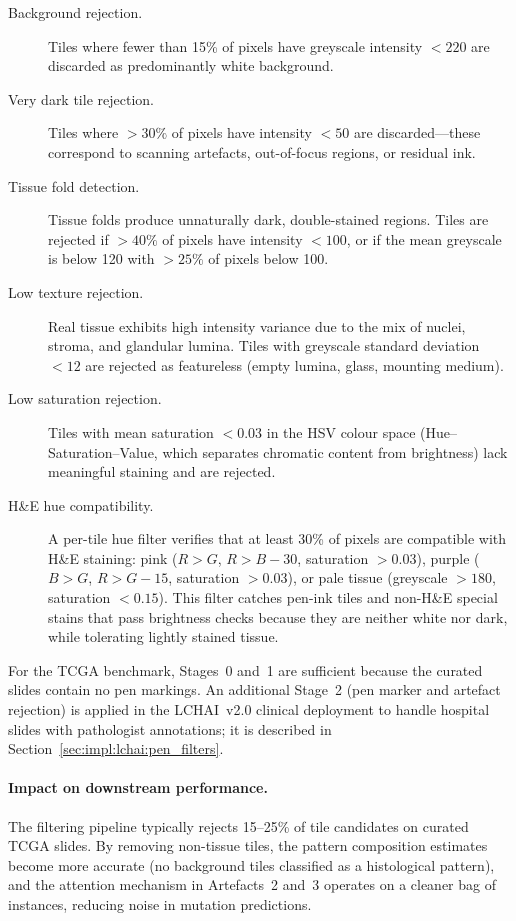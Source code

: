 \begin{description}
    \item[Background rejection.]
    Tiles where fewer than 15\% of pixels have greyscale intensity
    $< 220$ are discarded as predominantly white background.

    \item[Very dark tile rejection.]
    Tiles where $> 30\%$ of pixels have intensity $< 50$ are
    discarded---these correspond to scanning artefacts, out-of-focus
    regions, or residual ink.

    \item[Tissue fold detection.]
    Tissue folds produce unnaturally dark, double-stained regions.
    Tiles are rejected if $> 40\%$ of pixels have intensity $< 100$,
    or if the mean greyscale is below 120 with $> 25\%$ of pixels
    below 100.

    \item[Low texture rejection.]
    Real tissue exhibits high intensity variance due to the mix of
    nuclei, stroma, and glandular lumina.
    Tiles with greyscale standard deviation $< 12$ are rejected as
    featureless (empty lumina, glass, mounting medium).

    \item[Low saturation rejection.]
    Tiles with mean saturation $< 0.03$ in the HSV colour space
    (Hue--Saturation--Value, which separates chromatic content from
    brightness) lack meaningful staining and are rejected.

    \item[H\&E hue compatibility.]
    A per-tile hue filter verifies that at least 30\% of pixels are
    compatible with H\&E staining: pink ($R > G$, $R > B - 30$,
    saturation $> 0.03$), purple ($B > G$, $R > G - 15$,
    saturation $> 0.03$), or pale tissue (greyscale $> 180$,
    saturation $< 0.15$).
    This filter catches pen-ink tiles and non-H\&E special stains
    that pass brightness checks because they are neither white nor
    dark, while tolerating lightly stained tissue.
\end{description}

For the TCGA benchmark, Stages~0 and~1 are sufficient because the
curated slides contain no pen markings.
An additional Stage~2 (pen marker and artefact rejection) is applied
in the LCHAI~v2.0 clinical deployment to handle hospital slides with
pathologist annotations; it is described in
Section~\ref{sec:impl:lchai:pen_filters}.

\paragraph{Impact on downstream performance.}
The filtering pipeline typically rejects 15--25\% of tile candidates
on curated TCGA slides.
By removing non-tissue tiles, the pattern composition estimates
become more accurate (no background tiles classified as a histological
pattern), and the attention mechanism in Artefacts~2 and~3 operates on
a cleaner bag of instances, reducing noise in mutation predictions.


